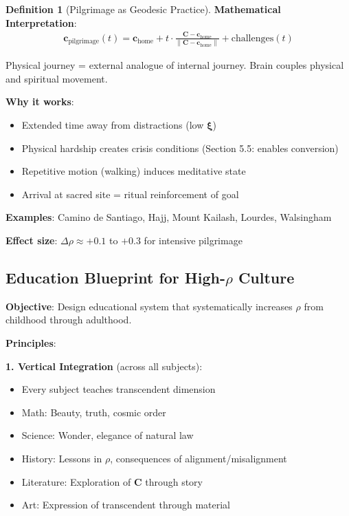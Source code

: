 \documentclass[11pt,a4paper]{article}
\theoremstyle{definition}
\newtheorem{definition}{Definition}[section]
\theoremstyle{remark}
\newcommand{\cc}{\mathbf{c}}
\begin{document}
\begin{small}
\begin{enumerate}
\begin{protocol}
\begin{definition}[Pilgrimage as Geodesic Practice]
\textbf{Mathematical Interpretation}:
\begin{align}
\cc_{\text{pilgrimage}}(t) = \cc_{\text{home}} + t \cdot \frac{\mathbf{C} - \cc_{\text{home}}}{\|\mathbf{C} - \cc_{\text{home}}\|} + \text{challenges}(t)
\end{align}

Physical journey = external analogue of internal journey. Brain couples physical and spiritual movement.

\textbf{Why it works}:
\begin{itemize}
    \item Extended time away from distractions (low \(\boldsymbol{\xi}\))
    \item Physical hardship creates crisis conditions (Section 5.5: enables conversion)
    \item Repetitive motion (walking) induces meditative state
    \item Arrival at sacred site = ritual reinforcement of goal
\end{itemize}

\textbf{Examples}: Camino de Santiago, Hajj, Mount Kailash, Lourdes, Walsingham

\textbf{Effect size}: \(\Delta\rho \approx +0.1\) to \(+0.3\) for intensive pilgrimage
\end{definition}

\subsection{Education Blueprint for High-\(\rho\) Culture}

\begin{protocol}
\textbf{Objective}: Design educational system that systematically increases \(\rho\) from childhood through adulthood.

\textbf{Principles}:

\textbf{1. Vertical Integration} (across all subjects):
\begin{itemize}
    \item Every subject teaches transcendent dimension
    \item Math: Beauty, truth, cosmic order
    \item Science: Wonder, elegance of natural law
    \item History: Lessons in \(\rho\), consequences of alignment/misalignment
    \item Literature: Exploration of \(\mathbf{C}\) through story
    \item Art: Expression of transcendent through material
\end{itemize}


\end{protocol}
\end{protocol}
\end{enumerate}
\end{small}
\end{document}
